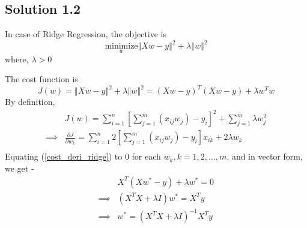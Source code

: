 \subsection*{Solution 1.2}
In case of Ridge Regression, the objective is
\begin{equation}
	\underset{w}{\text{minimize}}\left\Vert Xw-y \right\Vert^2 + \lambda\left\Vert w \right\Vert^2
\end{equation}
where, $\lambda > 0$
\par
The cost function is
\begin{equation}
\label{cost_func_ridge}
	J(w) = \left\Vert Xw-y \right\Vert^2 + \lambda\left\Vert w \right\Vert^2 = (Xw -y)^T(Xw -y) + \lambda w^Tw
\end{equation}
By definition,
\begin{equation}
\label{cost_deri_ridge}
	\begin{split}
					& J(w) = \sum_{i=1}^{n}\left[ \sum_{j=1}^{m}(x_{ij}w_j)-y_i \right]^2 + \sum_{j=1}^{m}\lambda w_j^2\\
		\implies 	& \frac{\partial J}{\partial w_k} = \sum_{i=1}^{n} 2 \left[ \sum_{j=1}^{m}(x_{ij}w_j)-y_i \right]x_{ik} + 2\lambda w_k\\
	\end{split}
\end{equation}
Equating (\ref{cost_deri_ridge}) to $0$ for each $w_k, k=1,2,\dots, m$, and in vector form, we get - 
\begin{equation}
	\begin{split}
					& X^T(Xw^* - y) + \lambda w^* = 0\\
		\implies	& (X^TX + \lambda I)w^* = X^Ty\\
		\implies	& w^* = (X^TX + \lambda I)^{-1}X^Ty\\
	\end{split}
\end{equation}